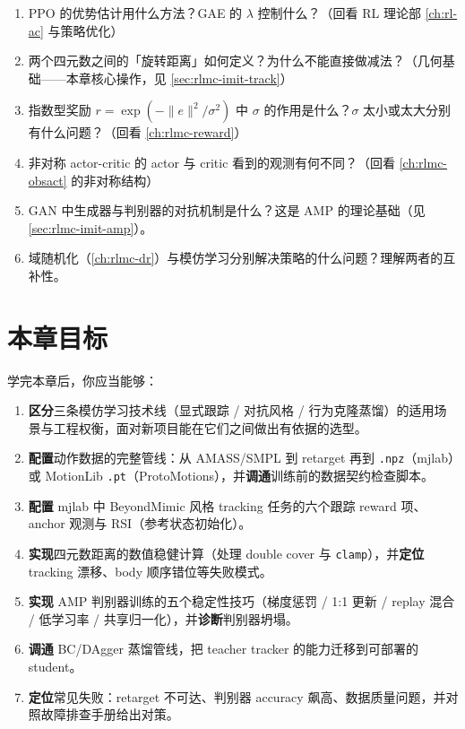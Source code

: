 \begin{practice}
\begin{enumerate}
  \item PPO 的优势估计用什么方法？GAE 的 $\lambda$ 控制什么？（回看 RL 理论部 \cref{ch:rl-ac} 与策略优化）
  \item 两个四元数之间的「旋转距离」如何定义？为什么不能直接做减法？（几何基础——本章核心操作，见 \cref{sec:rlmc-imit-track}）
  \item 指数型奖励 $r=\exp(-\|e\|^2/\sigma^2)$ 中 $\sigma$ 的作用是什么？$\sigma$ 太小或太大分别有什么问题？（回看 \cref{ch:rlmc-reward}）
  \item 非对称 actor-critic 的 actor 与 critic 看到的观测有何不同？（回看 \cref{ch:rlmc-obsact} 的非对称结构）
  \item GAN 中生成器与判别器的对抗机制是什么？这是 AMP 的理论基础（见 \cref{sec:rlmc-imit-amp}）。
  \item 域随机化（\cref{ch:rlmc-dr}）与模仿学习分别解决策略的什么问题？理解两者的互补性。
\end{enumerate}
\end{practice}

\section*{本章目标}
\label{sec:rlmc-imit-goals}

学完本章后，你应当能够：

\begin{enumerate}
  \item \textbf{区分}三条模仿学习技术线（显式跟踪 / 对抗风格 / 行为克隆蒸馏）的适用场景与工程权衡，面对新项目能在它们之间做出有依据的选型。
  \item \textbf{配置}动作数据的完整管线：从 AMASS/SMPL 到 retarget 再到 \texttt{.npz}（mjlab）或 MotionLib \texttt{.pt}（ProtoMotions），并\textbf{调通}训练前的数据契约检查脚本。
  \item \textbf{配置} mjlab 中 BeyondMimic 风格 tracking 任务的六个跟踪 reward 项、anchor 观测与 RSI（参考状态初始化）。
  \item \textbf{实现}四元数距离的数值稳健计算（处理 double cover 与 \texttt{clamp}），并\textbf{定位} tracking 漂移、body 顺序错位等失败模式。
  \item \textbf{实现} AMP 判别器训练的五个稳定性技巧（梯度惩罚 / 1:1 更新 / replay 混合 / 低学习率 / 共享归一化），并\textbf{诊断}判别器坍塌。
  \item \textbf{调通} BC/DAgger 蒸馏管线，把 teacher tracker 的能力迁移到可部署的 student。
  \item \textbf{定位}常见失败：retarget 不可达、判别器 accuracy 飙高、数据质量问题，并对照故障排查手册给出对策。
\end{enumerate}

